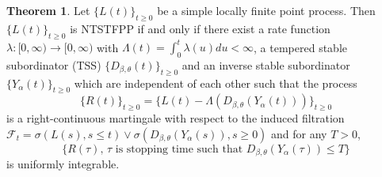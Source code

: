 \documentclass[11pt,oneside,reqno]{amsart}
\theoremstyle{definition}
\newtheorem{theorem}{\bf Theorem}[section]
\theoremstyle{remarkstyle}
\begin{document}
\begin{theorem}\label{Watanabe_characterization_NTSTFPP}
    Let $\{L(t)\}_{t\ge 0}$ be a simple locally finite point process. Then $\{L(t)\}_{t\ge 0}$ is NTSTFPP if and only if there exist a rate function $\lambda:[0,\infty)\to[0,\infty)$ with $\Lambda(t)=\int_{0}^{t}\lambda(u)du<\infty$, a tempered stable subordinator (TSS) $\{D_{\beta,\theta}(t)\}_{t\ge 0}$ and an inverse stable subordinator $\{Y_\alpha(t)\}_{t\ge 0}$ which are independent of each other such that the process 
    \begin{equation*}\label{martingale_form_NTSTFPP}
    \{R(t)\}_{t\ge 0}=\{L(t)-\Lambda(D_{\beta,\theta}(Y_{\alpha}(t)))\}_{t\ge 0}    
    \end{equation*} 
    is a right-continuous martingale with respect to the induced filtration $\mathcal{F}_t=\sigma\left(L(s),s\le t\right)\vee\sigma\left(D_{\beta,\theta}(Y_{\alpha}(s)), s\ge 0\right)$ and for any $T>0$,
    \begin{equation*}\label{stopping_times_martingale_NTSTFPP}
        \{R(\tau),\,\tau\,\, \text{is stopping time such that}\,\,D_{\beta,\theta}(Y_{\alpha}(\tau))\le T\}
    \end{equation*}
    is uniformly integrable.
\end{theorem}
\end{document}
